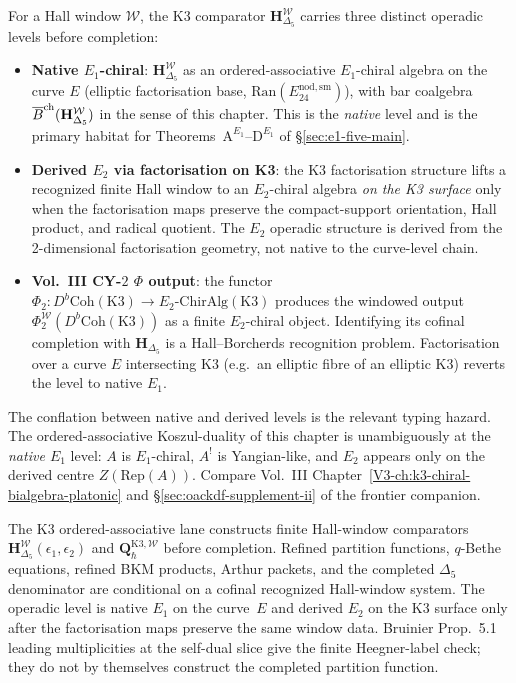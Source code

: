 \begin{remark}
\label{rem:v2-oackd-eone-etwo-scope}
For a Hall window $\mathcal W$, the K3 comparator
$\mathbf H_{\Delta_5}^{\mathcal W}$ carries three distinct operadic
levels before completion:
\begin{itemize}
\item \textbf{Native $E_1$-chiral}: $\mathbf H_{\Delta_5}^{\mathcal W}$ as an
 ordered-associative $E_1$-chiral algebra on the curve $E$ (elliptic
 factorisation base, $\mathrm{Ran}(E^{\mathrm{nod,sm}}_{24})$), with
 bar coalgebra $\overline{B}^{\mathrm{ch}}(\mathbf H_{\Delta_5}^{\mathcal W})$ in the sense of this
 chapter. This is the \emph{native} level and is the primary habitat
 for Theorems~$\mathrm A^{E_1}$--$\mathrm D^{E_1}$ of
 \S\ref{sec:e1-five-main}.
\item \textbf{Derived $E_2$ via factorisation on K3}: the K3 factorisation
 structure lifts a recognized finite Hall window to an $E_2$-chiral
 algebra \emph{on the K3 surface} only when the factorisation maps
 preserve the compact-support orientation, Hall product, and radical
 quotient. The $E_2$ operadic structure is derived from the
 2-dimensional factorisation geometry, not native to the curve-level
 chain.
\item \textbf{Vol.~III CY-$2$ $\Phi$ output}: the functor
 $\Phi_2 : D^b\mathrm{Coh}(\mathrm{K3}) \to E_2\text{-}\mathrm{ChirAlg}(\mathrm{K3})$
 produces the windowed output
 $\Phi_2^{\mathcal W}(D^b\mathrm{Coh}(\mathrm{K3}))$ as a finite
 $E_2$-chiral object.  Identifying its cofinal completion with
 $\mathbf H_{\Delta_5}$ is a Hall--Borcherds recognition problem.
 Factorisation over a curve $E$ intersecting K3 (e.g.\ an elliptic
 fibre of an elliptic K3) reverts the level to native $E_1$.
\end{itemize}
The conflation between native and derived levels is the relevant
typing hazard. The ordered-associative Koszul-duality of this chapter
is unambiguously at the \emph{native
$E_1$} level: $A$ is $E_1$-chiral, $A^!$ is Yangian-like, and $E_2$
appears only on the derived centre $Z(\mathrm{Rep}(A))$. Compare
Vol.~III Chapter~\ref{V3-ch:k3-chiral-bialgebra-platonic} and
\S\ref{sec:oackdf-supplement-ii} of the frontier companion.
\end{remark}

\begin{remark}[Summary]
\label{rem:v2-oackd-refined-summary}
The K3 ordered-associative lane constructs finite Hall-window
comparators
$\mathbf H_{\Delta_5}^{\mathcal W}(\epsilon_1,\epsilon_2)$ and
$\mathbf Q_{\hbar}^{\mathrm{K3},\mathcal W}$ before completion.  Refined
partition functions, $q$-Bethe equations, refined BKM products, Arthur
packets, and the completed $\Delta_5$ denominator are conditional on a
cofinal recognized Hall-window system. The operadic level is native
$E_1$ on the curve~$E$ and derived $E_2$ on the K3 surface only after
the factorisation maps preserve the same window data. Bruinier
Prop.~5.1 leading multiplicities at the self-dual slice give the finite
Heegner-label check; they do not by themselves construct the completed
partition function.
\end{remark}
